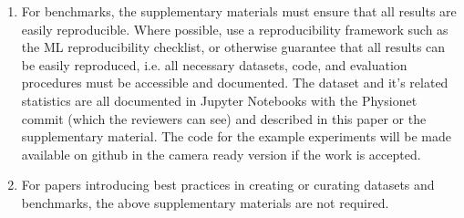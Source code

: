 \begin{enumerate}
\item For benchmarks, the supplementary materials must ensure that all results are easily reproducible. Where possible, use a reproducibility framework such as the ML reproducibility checklist, or otherwise guarantee that all results can be easily reproduced, i.e. all necessary datasets, code, and evaluation procedures must be accessible and documented. \answerYes{} The dataset and it's related statistics are all documented in Jupyter Notebooks with the Physionet commit (which the reviewers can see) and described in this paper or the supplementary material. The code for the example experiments will be made available on github in the camera ready version if the work is accepted.

\item For papers introducing best practices in creating or curating datasets and benchmarks, the above supplementary materials are not required.
\end{enumerate}